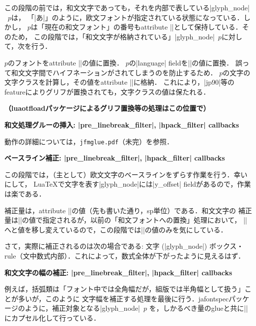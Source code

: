 この段階の前では，和文文字であっても，それを内部で表している|glyph_node|~$p$は，
「|\tenrm あ|」のように，欧文フォントが指定されている状態になっている．しかし，
$p$は「現在の和文フォント」の番号もattribute |\ltj@curjfnt|として保持している．そのため，
この段階では，「和文文字が格納されている」|glyph_node|~$p$に対して，次を行う．

\itemitem $p$のフォントをattribute |\ltj@curjfnt|の値に置換．
\itemitem $p$の|language| fieldを|\ltj@japanese|の値に置換．
誤って和文文字間でハイフネーションがされてしまうのを防止するため．
\itemitem $p$の文字の文字クラスを計算し，その値をattribute |\ltj@charclass|に格納．
これにより，|jp90|等のfeatureによりグリフが置換されても，文字クラスの値は保たれる．

\item {\bf （luaotfloadパッケージによるグリフ置換等の処理はこの位置で）}

\item {\bf 和文処理グルーの挿入: |pre_linebreak_filter|, |hpack_filter| callbacks}

動作の詳細については，{\tt jfmglue.pdf}（未完）を参照．

\item {\bf ベースライン補正: |pre_linebreak_filter|, |hpack_filter| callbacks}

この段階では，（主として）欧文文字のベースラインをずらす作業を行う．幸いにして，
Lua\TeX で文字を表す|glyph_node|には|y_offset| fieldがあるので，作業は楽である．

補正量は，attribute |\ltj@yablshift|の値（先も書いた通り，sp単位）である．和文文字の
補正量は|\ltj@ykblshift|の値で指定されるが，以前の「和文フォントへの置換」処理において，
|\ltj@yablshift|へと値を移し変えているので，この段階では|\ltj@yablshift|の値のみを気にしている．

さて，実際に補正されるのは次の場合である:
\itemitem 文字 (|glyph_node|)
\itemitem ボックス・rule（文中数式内部）．これによって，数式全体が下がったように見えるはず．

\item {\bf 和文文字の幅の補正: |pre_linebreak_filter|, |hpack_filter| callbacks}

例えば，括弧類は「フォント中では全角幅だが，組版では半角幅として扱う」ことが多いが，このように
文字幅を補正する処理を最後に行う．jafontspecパッケージのように，補正対象となる|glyph_node|~$p$%
を，しかるべき量のglueと共に|\hbox|にカプセル化して行っている．

\enditem 


\vfill\eject
{}

